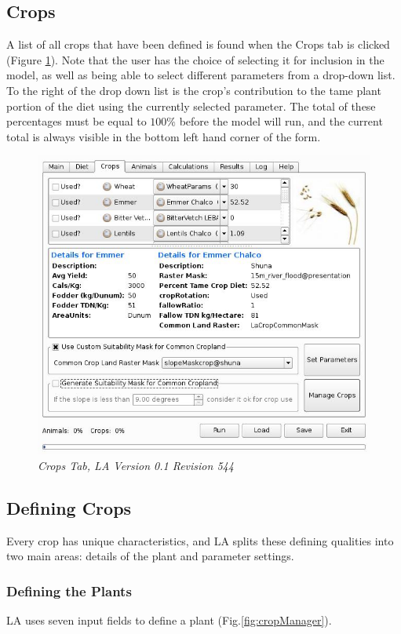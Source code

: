  \subsection{Crops}
    A list of all crops that have been defined is found when the Crops tab is
    clicked (Figure \ref{fig:crop}).  Note that the user has the choice of
    selecting it for inclusion in the model, as well as being able to select
    different parameters from a drop-down list.  To the right of the drop down
    list is the crop's contribution to the tame plant portion of the diet using
    the currently selected parameter.  The total of these percentages must be
    equal to $100\%$ before the model will run, and the current total is always
    visible in the bottom left hand corner of the form.
\begin{figure}[htbp]
    \includegraphics[scale=.36]{./images/LanduseAnalystCrops546.jpg}
    \caption{\label{fig:crop}\textit{Crops Tab, LA Version 0.1 Revision 544}}
\end{figure}

  \subsection{Defining Crops}Every crop has unique
  characteristics, and LA splits these defining qualities into two
  main areas:  details of the plant and parameter settings.
    \subsubsection{Defining the Plants}LA uses seven input fields to define a
      plant (Fig.\ref{fig:cropManager}).

